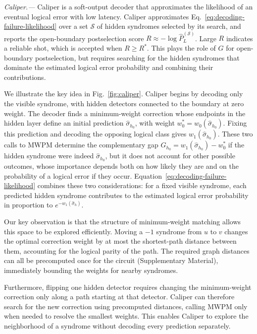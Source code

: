 \documentclass[
    reprint,
    amsmath,amssymb,
    nofootinbib,
    superscriptaddress,
    aps,
    noeprint,
    longbibliography,
    prl
]{revtex4-2}
\theoremstyle{plain}
\begin{document}
\textit{Caliper.---} Caliper is a soft-output decoder that
approximates the likelihood of an eventual logical error with low latency. Caliper approximates
Eq.~\eqref{eq:decoding-failure-likelihood} over a set $\mathcal S$ of hidden syndromes selected by
its search, and reports the open-boundary postselection score $R \approx -\log \hat P_L^{(\mathcal S)}$.
Large $R$ indicates a reliable shot, which is accepted when $R\geq R^*$. This plays the role of $G$ for open-boundary postselection, but requires searching for the hidden syndromes that dominate the estimated logical error probability and combining their contributions.

We illustrate the key idea in Fig.~\ref{fig:caliper}. Caliper begins by decoding only the visible
syndrome, with hidden detectors connected to the boundary at zero weight. The decoder finds a minimum-weight
correction whose endpoints in the hidden layer define an initial prediction $\hat\sigma_{h_0}$, with
weight $w_0^*=w_0(\hat\sigma_{h_0})$. Fixing this prediction and decoding the opposing logical
class gives $w_1(\hat\sigma_{h_0})$. These two calls to MWPM determine the complementary gap
$G_{h_0}=w_1(\hat\sigma_{h_0})-w_0^*$ if the hidden syndrome were indeed $\hat{\sigma}_{h_0}$, 
but it does not account for other possible outcomes, whose importance depends both on how likely they are and on the probability of a
logical error if they occur. Equation~\eqref{eq:decoding-failure-likelihood} combines these two
considerations: for a fixed visible syndrome, each predicted hidden syndrome contributes to the estimated logical
error probability in proportion to $e^{-w_1(\hat\sigma_h)}$.

Our key observation is that the structure of minimum-weight matching allows this space to be
explored efficiently. Moving a $-1$ syndrome from $u$ to $v$ changes the optimal correction
weight by at most the shortest-path distance between them, accounting for the logical parity of the
path. The required graph distances
can all be precomputed once for the circuit (Supplementary Material), immediately bounding the weights for nearby syndromes.

Furthermore, flipping one hidden detector requires changing the minimum-weight correction only along a path starting at that detector. Caliper can therefore search for the new correction using precomputed distances, calling MWPM only when needed to resolve the smallest weights. This enables Caliper to explore the neighborhood of a syndrome without decoding every prediction separately.
\end{document}
